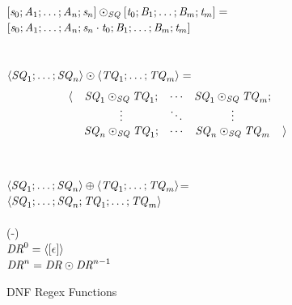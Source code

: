 \documentclass[numbers]{sigplanconf}
\begin{document}
\begin{figure}
\ConcatSequence{} \OfType{} \ArrowTypeOf{\SequenceType{}}{\ArrowTypeOf{\SequenceType{}}{\SequenceType{}}}\\
$[\mathit{s}_0;\mathit{A}_1;\ldots;\mathit{A}_n;\mathit{s}_n]\odot_{\mathit{SQ}}[\mathit{t}_0;\mathit{B}_1;\ldots;\mathit{B}_m;\mathit{t}_m]=$\\
\hspace*{2ex}$[\mathit{s}_0;\mathit{A}_1;\ldots;\mathit{A}_n;\mathit{s}_n\cdot\mathit{t}_0;\mathit{B}_1;\ldots;\mathit{B}_m;\mathit{t}_m]$\\
\\
\ConcatDNF{} \OfType{} \ArrowTypeOf{\DNFRegexType{}}{\ArrowTypeOf{\DNFRegexType{}}{\DNFRegexType{}}}\\
$\langle\mathit{SQ}_1;\ldots;\mathit{SQ}_n\rangle\odot\langle\mathit{TQ}_1;\ldots;\mathit{TQ}_m\rangle=$
\[
\begin{array}{rcccl}
\langle & \mathit{SQ}_1\odot_{\mathit{SQ}}\mathit{TQ}_1; & \cdots & \mathit{SQ}_1\odot_{\mathit{SQ}}\mathit{TQ}_m; \\
& \vdots & \ddots & \vdots \\
& \mathit{SQ}_n\odot_{\mathit{SQ}}\mathit{TQ}_1; & \cdots & \mathit{SQ}_n\odot_{\mathit{SQ}}\mathit{TQ}_m & \rangle
\end{array}
\]
\\
\OrDNF{} \OfType{}
\ArrowTypeOf{\DNFRegexType{}}{\ArrowTypeOf{\DNFRegexType{}}{\DNFRegexType{}}
}\\
$\langle\mathit{SQ}_1;\ldots;\mathit{SQ}_n\rangle\oplus\langle\mathit{TQ}_1;\ldots;\mathit{TQ}_m\rangle$=\\
\hspace*{2ex}$\langle\mathit{SQ}_1;\ldots;\mathit{SQ}_n;\mathit{TQ}_1;\ldots;\mathit{TQ}_m\rangle$\\
\\
(-) \OfType{} \ArrowTypeOf{\DNFRegexType{}}{\DNFRegexType{}}\\
$\mathit{DR}^{0}=\langle[\epsilon]\rangle$\\
$\mathit{DR}^{n}=\mathit{DR}\odot\mathit{DR}^{n-1}$\\
\caption{DNF Regex Functions} 
\label{fig:dnf-regex-functions}
\end{figure}
\end{document}
